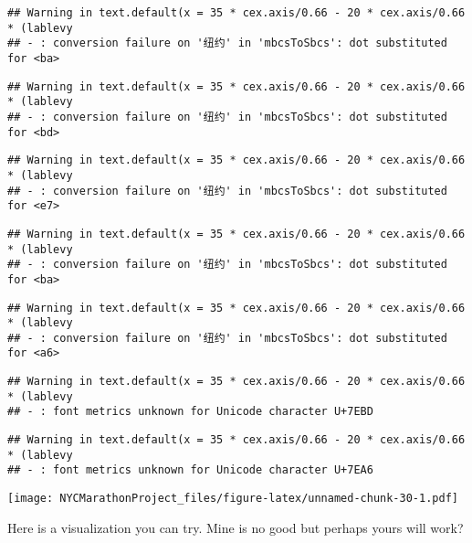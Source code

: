 \documentclass[
]{article}
\begin{document}
\begin{verbatim}
## Warning in text.default(x = 35 * cex.axis/0.66 - 20 * cex.axis/0.66 * (lablevy
## - : conversion failure on '纽约' in 'mbcsToSbcs': dot substituted for <ba>
\end{verbatim}

\begin{verbatim}
## Warning in text.default(x = 35 * cex.axis/0.66 - 20 * cex.axis/0.66 * (lablevy
## - : conversion failure on '纽约' in 'mbcsToSbcs': dot substituted for <bd>
\end{verbatim}

\begin{verbatim}
## Warning in text.default(x = 35 * cex.axis/0.66 - 20 * cex.axis/0.66 * (lablevy
## - : conversion failure on '纽约' in 'mbcsToSbcs': dot substituted for <e7>
\end{verbatim}

\begin{verbatim}
## Warning in text.default(x = 35 * cex.axis/0.66 - 20 * cex.axis/0.66 * (lablevy
## - : conversion failure on '纽约' in 'mbcsToSbcs': dot substituted for <ba>
\end{verbatim}

\begin{verbatim}
## Warning in text.default(x = 35 * cex.axis/0.66 - 20 * cex.axis/0.66 * (lablevy
## - : conversion failure on '纽约' in 'mbcsToSbcs': dot substituted for <a6>
\end{verbatim}

\begin{verbatim}
## Warning in text.default(x = 35 * cex.axis/0.66 - 20 * cex.axis/0.66 * (lablevy
## - : font metrics unknown for Unicode character U+7EBD
\end{verbatim}

\begin{verbatim}
## Warning in text.default(x = 35 * cex.axis/0.66 - 20 * cex.axis/0.66 * (lablevy
## - : font metrics unknown for Unicode character U+7EA6
\end{verbatim}

\texttt{[image: NYCMarathonProject\_files/figure-latex/unnamed-chunk-30-1.pdf]}

Here is a visualization you can try. Mine is no good but perhaps yours
will work?
\end{document}
